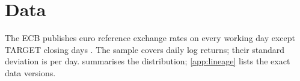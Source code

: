 \section{Data}\label{sec:data}

The ECB publishes euro reference exchange rates on every working day except TARGET
closing days \parencite{W-0001}.
The sample covers  daily log returns; their standard deviation is
 per day.  summarises the distribution;
\cref{app:lineage} lists the exact data versions.

\begin{table}[t]
  \caption{Daily EUR/USD log returns: summary statistics}\label{tab:summary}
  \centering
  
\end{table}
